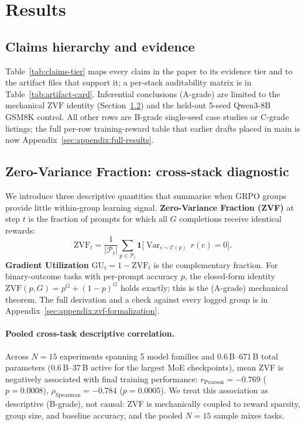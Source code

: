 \documentclass{article}
\begin{document}
\section{Results}
\label{sec:results}

\subsection{Claims hierarchy and evidence}
\label{sec:main_results}

Table~\ref{tab:claims-tier} maps every claim in the paper to its evidence
tier and to the artifact files that support it; a per-stack auditability
matrix is in Table~\ref{tab:artifact-card}. Inferential conclusions
(A-grade) are limited to the mechanical $\mathrm{ZVF}$ identity
(Section~\ref{sec:zvf-analysis}) and the held-out 5-seed Qwen3-8B GSM8K
control. All other rows are B-grade single-seed case studies or C-grade
listings; the full per-row training-reward table that earlier drafts
placed in main is now Appendix~\ref{sec:appendix:full-results}.




\subsection{Zero-Variance Fraction: cross-stack diagnostic}
\label{sec:zvf-analysis}

We introduce three descriptive quantities that summarise when GRPO groups
provide little within-group learning signal. \textbf{Zero-Variance
Fraction (ZVF)} at step $t$ is the fraction of prompts for which all $G$
completions receive identical rewards:
\[
  \mathrm{ZVF}_t = \frac{1}{|\mathcal{P}_t|}\sum_{p \in \mathcal{P}_t}
  \mathbf{1}\bigl[\operatorname{Var}_{c \sim \mathcal{C}(p)}\,r(c) = 0\bigr].
\]
\textbf{Gradient Utilization} $\mathrm{GU}_t = 1 - \mathrm{ZVF}_t$ is the
complementary fraction. For binary-outcome tasks with per-prompt accuracy
$p$, the closed-form identity $\mathrm{ZVF}(p, G) = p^G + (1-p)^G$ holds
exactly; this is the (A-grade) mechanical theorem. The full derivation
and a check against every logged group is in
Appendix~\ref{sec:appendix:zvf-formalization}.

\paragraph{Pooled cross-task descriptive correlation.}
Across $N = 15$ experiments spanning 5 model families and
0.6\,B--671\,B total parameters (0.6\,B--37\,B active for the largest
MoE checkpoints), mean ZVF is negatively associated with final training
performance: $r_{\text{Pearson}} = -0.769$ ($p = 0.0008$),
$\rho_{\text{Spearman}} = -0.784$ ($p = 0.0005$).
We treat this association as descriptive (B-grade), not causal: ZVF is
mechanically coupled to reward sparsity, group size, and baseline
accuracy, and the pooled $N{=}15$ sample mixes tasks.
\end{document}
